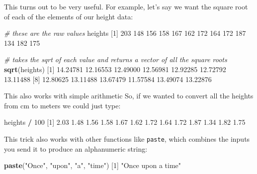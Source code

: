 \documentclass[]{article}
\newenvironment{Shaded}{\begin{snugshade}}{\end{snugshade}}
\newcommand{\CommentTok}[1]{\textcolor[rgb]{0.56,0.35,0.01}{\textit{#1}}}
\newcommand{\DecValTok}[1]{\textcolor[rgb]{0.00,0.00,0.81}{#1}}
\newcommand{\FloatTok}[1]{\textcolor[rgb]{0.00,0.00,0.81}{#1}}
\newcommand{\KeywordTok}[1]{\textcolor[rgb]{0.13,0.29,0.53}{\textbf{#1}}}
\newcommand{\NormalTok}[1]{#1}
\newcommand{\OperatorTok}[1]{\textcolor[rgb]{0.81,0.36,0.00}{\textbf{#1}}}
\newcommand{\StringTok}[1]{\textcolor[rgb]{0.31,0.60,0.02}{#1}}
\begin{document}
This turns out to be very useful. For example, let's say we want the square root
of each of the elements of our height data:

\begin{Shaded}
\begin{Highlighting}[]
\CommentTok{# these are the raw values}
\NormalTok{heights}
\NormalTok{ [}\DecValTok{1}\NormalTok{] }\DecValTok{203} \DecValTok{148} \DecValTok{156} \DecValTok{158} \DecValTok{167} \DecValTok{162} \DecValTok{172} \DecValTok{164} \DecValTok{172} \DecValTok{187} \DecValTok{134} \DecValTok{182} \DecValTok{175}

\CommentTok{# takes the sqrt of each value and returns a vector of all the square roots}
\KeywordTok{sqrt}\NormalTok{(heights)}
\NormalTok{ [}\DecValTok{1}\NormalTok{] }\FloatTok{14.24781} \FloatTok{12.16553} \FloatTok{12.49000} \FloatTok{12.56981} \FloatTok{12.92285} \FloatTok{12.72792} \FloatTok{13.11488}
\NormalTok{ [}\DecValTok{8}\NormalTok{] }\FloatTok{12.80625} \FloatTok{13.11488} \FloatTok{13.67479} \FloatTok{11.57584} \FloatTok{13.49074} \FloatTok{13.22876}
\end{Highlighting}
\end{Shaded}

This also works with simple arithmetic So, if we wanted to convert all the
heights from cm to meters we could just type:

\begin{Shaded}
\begin{Highlighting}[]
\NormalTok{heights }\OperatorTok{/}\StringTok{ }\DecValTok{100}
\NormalTok{ [}\DecValTok{1}\NormalTok{] }\FloatTok{2.03} \FloatTok{1.48} \FloatTok{1.56} \FloatTok{1.58} \FloatTok{1.67} \FloatTok{1.62} \FloatTok{1.72} \FloatTok{1.64} \FloatTok{1.72} \FloatTok{1.87} \FloatTok{1.34} \FloatTok{1.82} \FloatTok{1.75}
\end{Highlighting}
\end{Shaded}

This trick also works with other functions like \texttt{paste}, which combines the
inputs you send it to produce an alphanumeric string:

\begin{Shaded}
\begin{Highlighting}[]
\KeywordTok{paste}\NormalTok{(}\StringTok{"Once"}\NormalTok{, }\StringTok{"upon"}\NormalTok{, }\StringTok{"a"}\NormalTok{, }\StringTok{"time"}\NormalTok{)}
\NormalTok{[}\DecValTok{1}\NormalTok{] }\StringTok{"Once upon a time"}
\end{Highlighting}
\end{Shaded}
\end{document}
